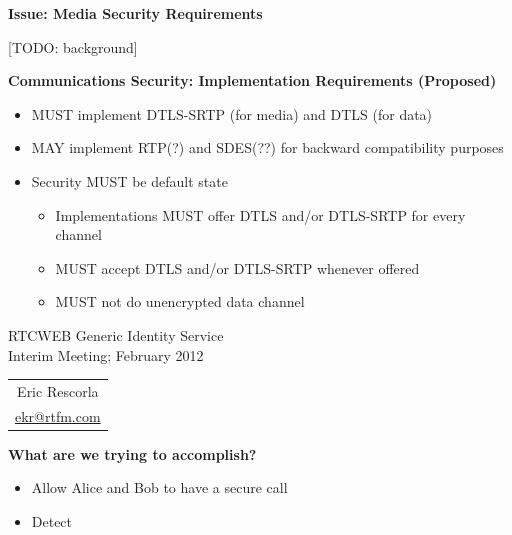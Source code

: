 \documentclass[helvetica]{seminar}
\newcommand{\heading}[1]{%
  \begin{center} 
    \large\bf 
    #1 
  \end{center} 
  \vspace{.4 in}}
\begin{document}
\begin{slide}
\heading{Issue: Media Security Requirements}

[TODO: background]

\end{slide}


\begin{slide}
\heading{Communications Security: Implementation Requirements (Proposed)}

\begin{itemize}
\item MUST implement DTLS-SRTP (for media) and DTLS (for data) 
\item MAY implement RTP(?) and SDES(??) for backward compatibility purposes 
\item Security MUST be default state
  \begin{itemize}
  \item Implementations MUST offer DTLS and/or DTLS-SRTP for every channel
  \item MUST accept DTLS and/or DTLS-SRTP whenever offered 
  \item MUST not do unencrypted data channel
  \end{itemize}
\end{itemize}

\end{slide}



\centerslidestrue

\begin{slide}
\begin{center}
\vspace{1 in}
\LARGE{{\bf}RTCWEB Generic Identity Service}\\
\vspace{.2in}
\large{{Interim Meeting; February 2012}} \\
\vspace{3em}
\large{
\begin{tabular}{c}
Eric Rescorla \\
\url{ekr@rtfm.com}
\end{tabular}
}
\end{center}

\end{slide}


\centerslidesfalse



\begin{slide}
\heading{What are we trying to accomplish?}

\begin{itemize}
\item Allow Alice and Bob to have a secure call
\item Detect
\end{itemize}

\end{slide}
\end{document}
